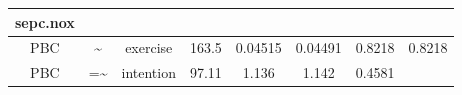 \documentclass[]{article}
\theoremstyle{definition}
\theoremstyle{definition}
\theoremstyle{definition}
\theoremstyle{remark}
\begin{document}
\begin{longtable}[]{@{}cccccccc@{}}
\begin{minipage}[b]{0.11\columnwidth}
sepc.nox\strut
\end{minipage}\tabularnewline
\midrule
\endhead
\begin{minipage}[t]{0.11\columnwidth}\centering\strut
PBC\strut
\end{minipage} & \begin{minipage}[t]{0.05\columnwidth}\centering\strut
\textasciitilde{}\strut
\end{minipage} & \begin{minipage}[t]{0.12\columnwidth}\centering\strut
exercise\strut
\end{minipage} & \begin{minipage}[t]{0.08\columnwidth}\centering\strut
163.5\strut
\end{minipage} & \begin{minipage}[t]{0.10\columnwidth}\centering\strut
0.04515\strut
\end{minipage} & \begin{minipage}[t]{0.10\columnwidth}\centering\strut
0.04491\strut
\end{minipage} & \begin{minipage}[t]{0.11\columnwidth}\centering\strut
0.8218\strut
\end{minipage} & \begin{minipage}[t]{0.11\columnwidth}\centering\strut
0.8218\strut
\end{minipage}\tabularnewline
\begin{minipage}[t]{0.11\columnwidth}\centering\strut
PBC\strut
\end{minipage} & \begin{minipage}[t]{0.05\columnwidth}\centering\strut
=\textasciitilde{}\strut
\end{minipage} & \begin{minipage}[t]{0.12\columnwidth}\centering\strut
intention\strut
\end{minipage} & \begin{minipage}[t]{0.08\columnwidth}\centering\strut
97.11\strut
\end{minipage} & \begin{minipage}[t]{0.10\columnwidth}\centering\strut
1.136\strut
\end{minipage} & \begin{minipage}[t]{0.10\columnwidth}\centering\strut
1.142\strut
\end{minipage} & \begin{minipage}[t]{0.11\columnwidth}\centering\strut
0.4581\strut
\end{minipage} & \begin{minipage}[t]{0.11\columnwidth}\centering\strut

\end{minipage}
\end{longtable}
\end{document}
